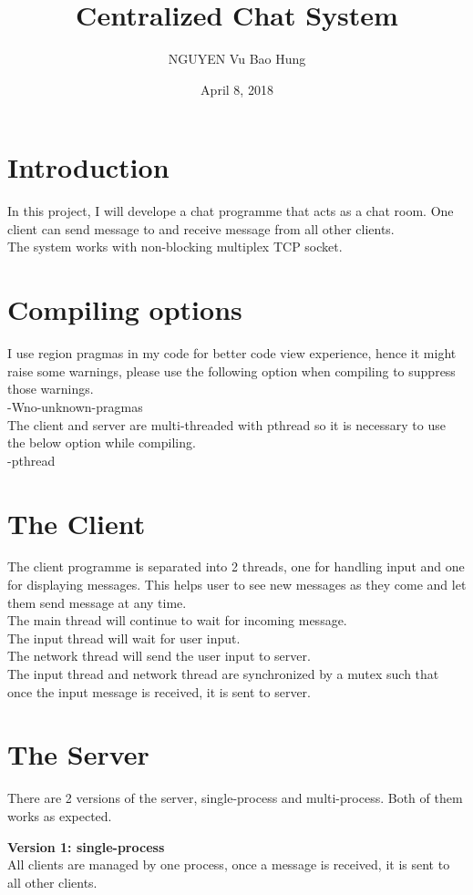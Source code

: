 \documentclass{article}
\title{Centralized Chat System}
\author{NGUYEN Vu Bao Hung}
\date{April 8, 2018}
\begin{document}
\maketitle

\section{Introduction}
In this project, I will develope a chat programme that acts as a chat room. One client can send message to and receive message from all other clients.\\
The system works with non-blocking multiplex TCP socket.

\section{Compiling options}
I use region pragmas in my code for better code view experience, hence it might raise some warnings, please use the following option when compiling to suppress those warnings.\\
-Wno-unknown-pragmas\\
The client and server are multi-threaded with pthread so it is necessary to use the below option while compiling.\\
-pthread

\section{The Client}
The client programme is separated into 2 threads, one for handling input and one for displaying messages. This helps user to see new messages as they come and let them send message at any time.\\
The main thread will continue to wait for incoming message.\\
The input thread will wait for user input.\\
The network thread will send the user input to server.\\
The input thread and network thread are synchronized by a mutex such that once the input message is received, it is sent to server.

\section{The Server}
There are 2 versions of the server, single-process and multi-process. Both of them works as expected.

\textbf{Version 1: single-process}\\
All clients are managed by one process, once a message is received, it is sent to all other clients.
\end{document}
